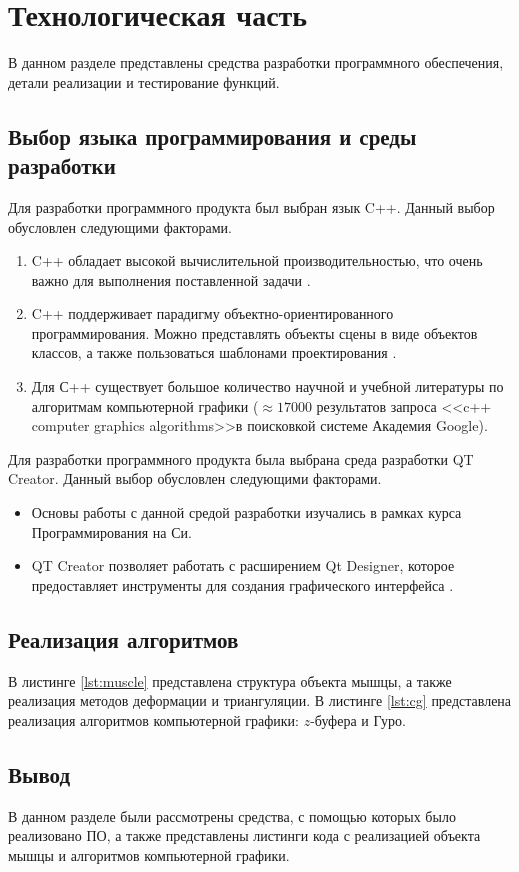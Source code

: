 \chapter{Технологическая часть}

В данном разделе представлены средства разработки программного обеспечения, детали реализации и тестирование функций.

\section{Выбор языка программирования и среды разработки}
Для разработки программного продукта был выбран язык C++.  Данный выбор обусловлен следующими факторами.

\begin{enumerate}[label=\arabic*)]
	\item C++ обладает высокой вычислительной производительностью, что очень важно для выполнения поставленной задачи \cite{cplusplusperfomance}.
	\item C++ поддерживает парадигму объектно-ориентированного программирования. Можно представлять объекты сцены в виде объектов классов, а также пользоваться шаблонами проектирования \cite{isocplusplus}.
	\item Для С++ существует большое количество научной и учебной литературы по алгоритмам компьютерной графики ($\approx17000$ результатов запроса <<c++ computer graphics algorithms>>в поисковкой системе Академия Google).
\end{enumerate}

Для разработки программного продукта была выбрана среда разработки QT Creator. Данный выбор обусловлен следующими факторами.

\begin{itemize}
	\item Основы работы с данной средой разработки изучались в рамках курса Программирования на Си.
	\item QT Creator позволяет работать с расширением Qt Designer, которое предоставляет инструменты для создания графического интерфейса \cite{qtdesigner}.
\end{itemize}

\section{Реализация алгоритмов}

В листинге \ref{lst:muscle} представлена структура объекта мышцы, а также реализация методов деформации и триангуляции. В листинге \ref{lst:cg} представлена реализация алгоритмов компьютерной графики: $z$-буфера и Гуро.


\section*{Вывод}

В данном разделе были рассмотрены средства, с помощью которых было реализовано ПО, а также представлены листинги кода с реализацией объекта мышцы и алгоритмов компьютерной графики.
